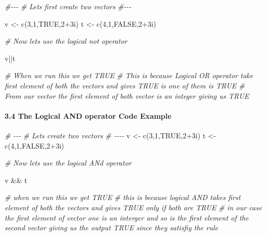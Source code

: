 \documentclass[
]{article}
\newenvironment{Shaded}{\begin{snugshade}}{\end{snugshade}}
\newcommand{\CommentTok}[1]{\textcolor[rgb]{0.56,0.35,0.01}{\textit{#1}}}
\newcommand{\ConstantTok}[1]{\textcolor[rgb]{0.00,0.00,0.00}{#1}}
\newcommand{\DecValTok}[1]{\textcolor[rgb]{0.00,0.00,0.81}{#1}}
\newcommand{\FunctionTok}[1]{\textcolor[rgb]{0.00,0.00,0.00}{#1}}
\newcommand{\NormalTok}[1]{#1}
\newcommand{\OtherTok}[1]{\textcolor[rgb]{0.56,0.35,0.01}{#1}}
\newcommand{\SpecialCharTok}[1]{\textcolor[rgb]{0.00,0.00,0.00}{#1}}
\begin{document}
\begin{Shaded}
\begin{Highlighting}[]
\CommentTok{\#{-}{-}{-}}
\CommentTok{\# Let\textquotesingle{}s first create two vectors}
\CommentTok{\#{-}{-}{-}}

\NormalTok{v }\OtherTok{\textless{}{-}} \FunctionTok{c}\NormalTok{(}\DecValTok{3}\NormalTok{,}\DecValTok{1}\NormalTok{,}\ConstantTok{TRUE}\NormalTok{,}\DecValTok{2}\SpecialCharTok{+}\NormalTok{3i) }
\NormalTok{t }\OtherTok{\textless{}{-}} \FunctionTok{c}\NormalTok{(}\DecValTok{4}\NormalTok{,}\DecValTok{1}\NormalTok{,}\ConstantTok{FALSE}\NormalTok{,}\DecValTok{2}\SpecialCharTok{+}\NormalTok{3i) }

\CommentTok{\# Now let\textquotesingle{}s use the logical not operator}

\NormalTok{v}\SpecialCharTok{||}\NormalTok{t}

\CommentTok{\# When we run this we get TRUE}
\CommentTok{\# This is because Logical OR operator take first element of both the vectors and gives TRUE is one of them is TRUE }
\CommentTok{\# From our vector the first element of both vector is an integer giving us TRUE}
\end{Highlighting}
\end{Shaded}

\hypertarget{the-logical-and-operator-code-example}{%
\paragraph{3.4 The Logical AND operator Code
Example}\label{the-logical-and-operator-code-example}}

\begin{Shaded}
\begin{Highlighting}[]
\CommentTok{\# {-}{-}{-}}
\CommentTok{\# Lets create two vectors}
\CommentTok{\# {-}{-}{-}{-}}
\NormalTok{v }\OtherTok{\textless{}{-}} \FunctionTok{c}\NormalTok{(}\DecValTok{3}\NormalTok{,}\DecValTok{1}\NormalTok{,}\ConstantTok{TRUE}\NormalTok{,}\DecValTok{2}\SpecialCharTok{+}\NormalTok{3i) }
\NormalTok{t }\OtherTok{\textless{}{-}} \FunctionTok{c}\NormalTok{(}\DecValTok{4}\NormalTok{,}\DecValTok{1}\NormalTok{,}\ConstantTok{FALSE}\NormalTok{,}\DecValTok{2}\SpecialCharTok{+}\NormalTok{3i) }

\CommentTok{\# Now let\textquotesingle{}s use the logical ANd operator}

\NormalTok{v }\SpecialCharTok{\&\&}\NormalTok{ t}

\CommentTok{\# when we run this we get TRUE}
\CommentTok{\# this is because logical AND takes first element of both the vectors and gives TRUE only if both are TRUE}
\CommentTok{\# in our case the first element of vector one is an interger and so is the first element of the second vector giving us the output TRUE since they satisfiy the rule}

\end{Highlighting}
\end{Shaded}
\end{document}
